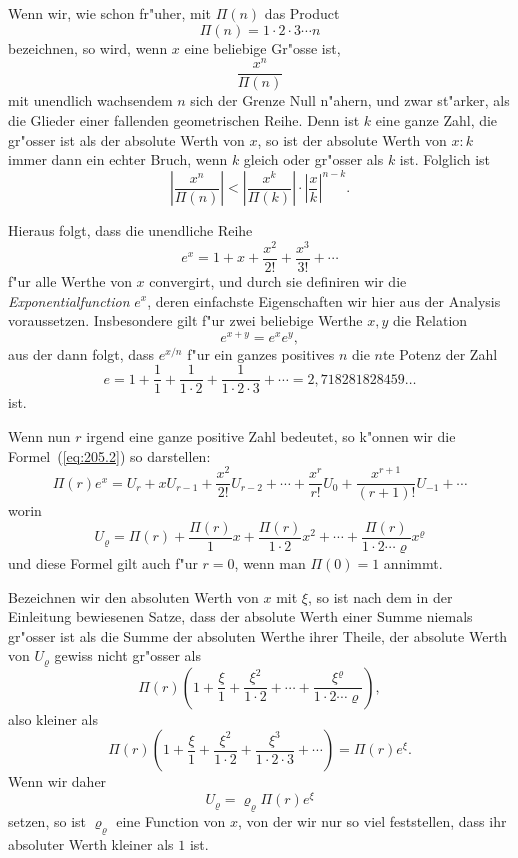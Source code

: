 \documentclass[10pt,a4paper]{article}
\theoremstyle{weberstyle}
\begin{document}
Wenn wir, wie schon fr"uher, mit $\Pi(n)$ das Product
\[
\Pi(n)=1\cdot 2\cdot 3\cdots n
\]
bezeichnen, so wird, wenn $x$ eine beliebige Gr"osse ist,
\begin{equation}\label{eq:205.1}
\frac{x^n}{\Pi(n)}
\end{equation}
mit unendlich wachsendem $n$ sich der Grenze Null n"ahern, und zwar
st"arker, als die Glieder einer fallenden geometrischen Reihe. Denn ist
$k$ eine ganze Zahl, die gr"osser ist als der absolute Werth von $x$, so
ist der absolute Werth von $x:k$ immer dann ein echter Bruch, wenn $k$
gleich oder gr"osser als $k$ ist. Folglich ist
\[
\left|\frac{x^n}{\Pi(n)}\right| <
\left|\frac{x^k}{\Pi(k)}\right|\cdot\left|\frac{x}{k}\right|^{n-k}.
\]

Hieraus folgt, dass die unendliche Reihe
\begin{equation}\label{eq:205.2}
e^x = 1 + x + \frac{x^2}{2!} + \frac{x^3}{3!} + \cdots
\end{equation}
f"ur alle Werthe von $x$ convergirt, und durch sie definiren wir die
\emph{Exponentialfunction} $e^x$, deren einfachste Eigenschaften wir hier
aus der Analysis voraussetzen. Insbesondere gilt f"ur zwei beliebige
Werthe $x,y$ die Relation
\[
e^{x+y} = e^x e^y,
\]
aus der dann folgt, dass $e^{x/n}$ f"ur ein ganzes positives $n$ die $n$te
Potenz der Zahl
\begin{equation}\label{eq:205.3}
e = 1 + \frac{1}{1} + \frac{1}{1\cdot 2} + \frac{1}{1\cdot 2\cdot 3} +
\cdots = 2{,}718281828459\dots
\end{equation}
ist.

Wenn nun $r$ irgend eine ganze positive Zahl bedeutet, so k"onnen wir die
Formel~(\ref{eq:205.2}) so darstellen:
\begin{equation}\label{eq:205.4}
\Pi(r)e^x = U_r + xU_{r-1} + \frac{x^2}{2!}U_{r-2} + \cdots +
\frac{x^r}{r!}U_0 + \frac{x^{r+1}}{(r+1)!}U_{-1} + \cdots
\end{equation}
worin
\begin{equation}\label{eq:205.5}
U_\varrho = \Pi(r) + \frac{\Pi(r)}{1}x +
\frac{\Pi(r)}{1\cdot 2}x^2 + \cdots + \frac{\Pi(r)}{1\cdot 2\cdots\varrho}x^\varrho
\end{equation}
und diese Formel gilt auch f"ur $r=0$, wenn man $\Pi(0)=1$ annimmt.

Bezeichnen wir den absoluten Werth von $x$ mit $\xi$, so ist nach dem in
der Einleitung bewiesenen Satze, dass der absolute Werth einer Summe
niemals gr"osser ist als die Summe der absoluten Werthe ihrer Theile, der
absolute Werth von $U_\varrho$ gewiss nicht gr"osser als
\[
\Pi(r)\left(1+\frac{\xi}{1}+\frac{\xi^2}{1\cdot 2}+\cdots+
\frac{\xi^\varrho}{1\cdot 2\cdots\varrho}\right),
\]
also kleiner als
\[
\Pi(r)\left(1+\frac{\xi}{1}+\frac{\xi^2}{1\cdot 2}+
\frac{\xi^3}{1\cdot 2\cdot 3}+\cdots\right) = \Pi(r)e^\xi.
\]
Wenn wir daher
\begin{equation}\label{eq:205.6}
U_\varrho = \varrho_\varrho \Pi(r) e^\xi
\end{equation}
setzen, so ist $\varrho_\varrho$ eine Function von $x$, von der wir nur so viel
feststellen, dass ihr absoluter Werth kleiner als $1$ ist.
\end{document}
